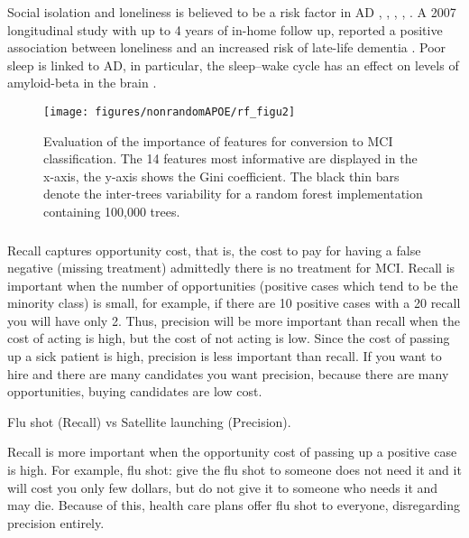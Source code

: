 \documentclass[preprint,12pt]{elsarticle}
\begin{document}
Social isolation and loneliness is believed to be a risk factor in AD \cite{holmen1992loneliness}, \cite{fratiglioni2000influence}, \cite{shankar2013social}, \cite{holwerda2014feelings}, \cite{evans2018social}. A 2007 longitudinal study with up to 4 years of in-home follow up, reported a positive association between loneliness and an increased risk of late-life dementia \cite{wilson2007loneliness}. Poor sleep is linked to AD, in particular, the sleep–wake cycle has an effect on levels of amyloid-beta in the brain \cite{ju2014sleep}.

\begin{figure}[!htb]
        \centering
        \texttt{[image: figures/nonrandomAPOE/rf\_figu2]}
        \caption{Evaluation of the importance of features for conversion to MCI classification.  The 14 features most informative are displayed in the x-axis, the y-axis shows the Gini coefficient. The black thin bars denote the inter-trees variability for a random forest implementation containing  100,000 trees.} 
        \label{fig:RF_selectorgini}
\end{figure}

\subsubsection{}
Recall captures opportunity cost, that is, the cost to pay for having a false negative (missing treatment) admittedly there is no treatment for MCI. Recall is important when the number of opportunities (positive cases which tend to be the minority class) is small, for example, if there are 10 positive cases with a 20 recall you will have only 2.
Thus, precision will be more important than recall when the cost of acting is high, but the cost of not acting is low.  Since the cost of passing up a sick patient is high, precision is less important than recall. If you want to hire and there are many candidates you want precision, because there are many opportunities, buying candidates are low cost.

Flu shot (Recall) vs Satellite launching (Precision).

Recall is more important when the opportunity cost of passing up a positive case is high. For example, flu  shot: give the flu shot to someone does not need it and it will cost you only few dollars, but do not give it to someone who needs it and may die. Because of this, health care plans offer flu shot to everyone, disregarding precision entirely.
\end{document}
